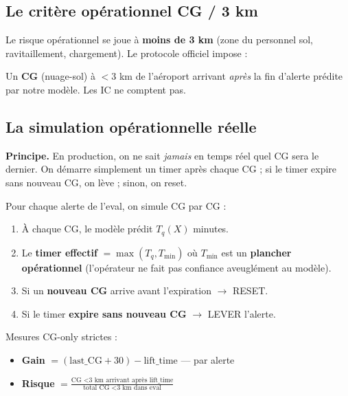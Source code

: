 \documentclass[11pt,a4paper]{article}
\begin{document}
\subsection{Le critère opérationnel CG / 3 km}

Le risque opérationnel se joue à \textbf{moins de 3 km} (zone du personnel sol, ravitaillement,
chargement). Le protocole officiel impose :

\begin{tcolorbox}[colback=orange!5,colframe=orange!60!black,title=\textbf{Incident}]
Un \textbf{CG} (nuage-sol) à $<3$ km de l'aéroport arrivant \emph{après} la fin d'alerte
prédite par notre modèle. Les IC ne comptent pas.
\end{tcolorbox}

\subsection{La simulation opérationnelle réelle}

\textbf{Principe.} En production, on ne sait \emph{jamais} en temps réel quel CG sera le
dernier. On démarre simplement un timer après chaque CG ; si le timer expire sans nouveau
CG, on lève ; sinon, on reset.

\begin{tcolorbox}[colback=blue!5,colframe=blue!50!black,title=\textbf{Mécanique simulée pas à pas}]
Pour chaque alerte de l'eval, on simule CG par CG :
\begin{enumerate}[topsep=2pt]
    \item À chaque CG, le modèle prédit $T_q(X)$ minutes.
    \item Le \textbf{timer effectif} $= \max(T_q, T_{\min})$ où $T_{\min}$ est un
    \textbf{plancher opérationnel} (l'opérateur ne fait pas confiance aveuglément au modèle).
    \item Si un \textbf{nouveau CG} arrive avant l'expiration $\to$ RESET.
    \item Si le timer \textbf{expire sans nouveau CG} $\to$ LEVER l'alerte.
\end{enumerate}

Mesures CG-only strictes :
\begin{itemize}[topsep=2pt]
    \item \textbf{Gain} $= (\text{last\_CG} + 30) - \text{lift\_time}$ — par alerte
    \item \textbf{Risque} $= \frac{\text{CG <3 km arrivant après lift\_time}}{\text{total CG <3 km dans eval}}$
\end{itemize}
\end{tcolorbox}
\end{document}
